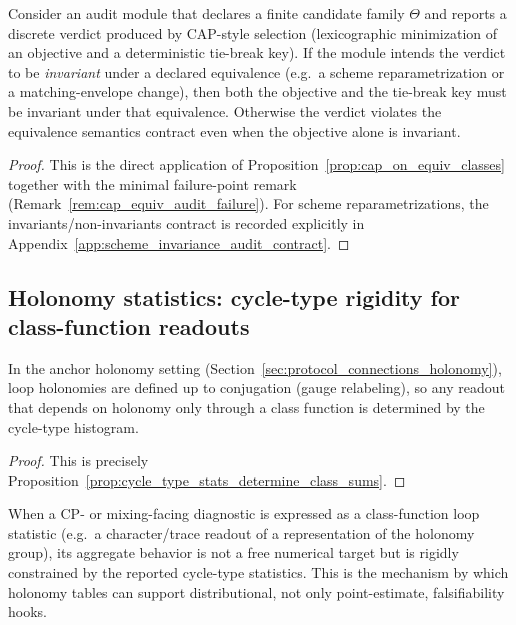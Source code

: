 \begin{proposition}\label{prop:rigidity_legality_invariant_verdicts}
\AuditTag Consider an audit module that declares a finite candidate family $\Theta$ and reports a discrete verdict produced by CAP-style selection
(lexicographic minimization of an objective and a deterministic tie-break key).
If the module intends the verdict to be \emph{invariant} under a declared equivalence (e.g.\ a scheme reparametrization or a matching-envelope change),
then both the objective and the tie-break key must be invariant under that equivalence.
Otherwise the verdict violates the equivalence semantics contract even when the objective alone is invariant.
\end{proposition}
\begin{proof}
This is the direct application of Proposition~\ref{prop:cap_on_equiv_classes} together with the minimal failure-point remark (Remark~\ref{rem:cap_equiv_audit_failure}).
For scheme reparametrizations, the invariants/non-invariants contract is recorded explicitly in Appendix~\ref{app:scheme_invariance_audit_contract}.
\end{proof}

\subsection{Holonomy statistics: cycle-type rigidity for class-function readouts}
\label{subsec:rigidity_cycle_type_statistics}

\begin{proposition}\label{prop:rigidity_cycle_type_class_functions}
\MathTag In the anchor holonomy setting (Section~\ref{sec:protocol_connections_holonomy}), loop holonomies are defined up to conjugation (gauge relabeling),
so any readout that depends on holonomy only through a class function is determined by the cycle-type histogram.
\end{proposition}
\begin{proof}
This is precisely Proposition~\ref{prop:cycle_type_stats_determine_class_sums}.
\end{proof}

\begin{remark}\label{rem:rigidity_cycle_type_strengthens_cp}
\AuditTag When a CP- or mixing-facing diagnostic is expressed as a class-function loop statistic (e.g.\ a character/trace readout of a representation of the holonomy group),
its aggregate behavior is not a free numerical target but is rigidly constrained by the reported cycle-type statistics.
This is the mechanism by which holonomy tables can support distributional, not only point-estimate, falsifiability hooks.
\end{remark}

